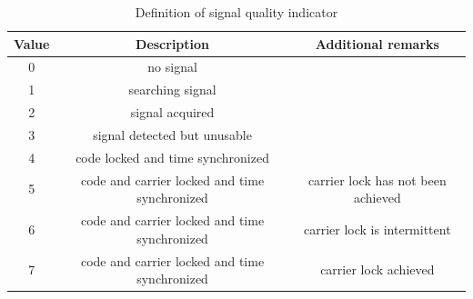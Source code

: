 \documentclass[letterpaper, 10 pt,onecolumn]{article}
\begin{document}
	\begin{table}[H]
		\centering
		\begin{tabular}{|c|c|c|}
			\hline
			Value & Description                                   & Additional remarks                 \\ \hline
			0     & no signal                                     &                                    \\ \hline
			1     & searching signal                              &                                    \\ \hline
			2     & signal acquired                               &                                    \\ \hline
			3     & signal detected but unusable                  &                                    \\ \hline
			4     & code locked and time synchronized             &                                    \\ \hline
			5     & code and carrier locked and time synchronized & carrier lock has not been achieved \\ \hline
			6     & code and carrier locked and time synchronized & carrier lock is intermittent       \\ \hline
			7     & code and carrier locked and time synchronized & carrier lock achieved              \\ \hline
		\end{tabular}
		\label{tab:qi}
		\caption{Definition of signal quality indicator}
	\end{table}
	
\end{document}
